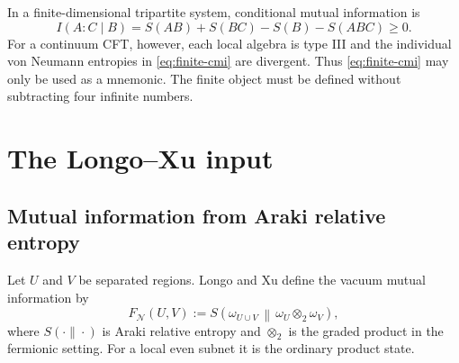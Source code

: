 \documentclass[11pt]{article}
\theoremstyle{accenttheorem}
\theoremstyle{definition}
\newcommand{\cN}{\mathcal{N}}
\newcommand{\MI}{F}
\newcommand{\RE}{S}
\newcommand{\1}{\mathbf{1}}
\begin{document}
\begin{center}
\end{center}

In a finite-dimensional tripartite system, conditional mutual information is
\begin{equation}\label{eq:finite-cmi}
 I(A:C\mid B)
 =S(AB)+S(BC)-S(B)-S(ABC)\ge 0.
\end{equation}
For a continuum CFT, however, each local algebra is type III and the individual von Neumann entropies in \eqref{eq:finite-cmi} are divergent.  Thus \eqref{eq:finite-cmi} may only be used as a mnemonic.  The finite object must be defined without subtracting four infinite numbers.

\section{The Longo--Xu input}

\subsection{Mutual information from Araki relative entropy}

Let \(U\) and \(V\) be separated regions.  Longo and Xu define the vacuum mutual information by
\begin{equation}\label{eq:MI-relative}
 \MI_{\cN}(U,V)
 :=\RE\!\left(\omega_{U\cup V}\,\middle\|\,
                 \omega_U\otimes_2\omega_V\right),
\end{equation}
where \(\RE(\cdot\|\cdot)\) is Araki relative entropy and \(\otimes_2\) is the graded product in the fermionic setting.  For a local even subnet it is the ordinary product state.
\end{document}
